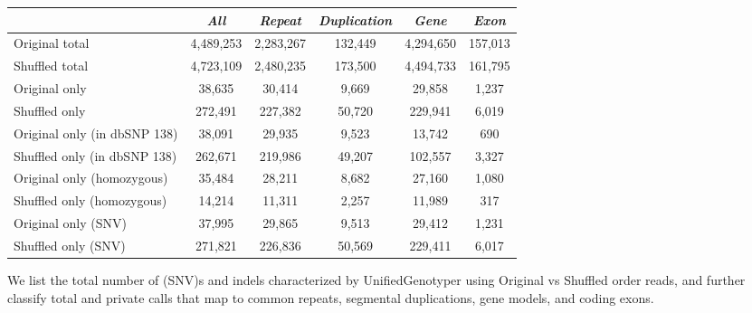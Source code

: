 \begin{table}[htb]
\begin{center}
\begin{tabular}{|l|c||c|c|c|c|}
\hline
\cline{2-6}
{\bf} & {\it All} & {\it Repeat} & {\it Duplication} & {\it Gene} & {\it Exon} \\
\hline
Original total & 4,489,253 & 2,283,267 & 132,449 & 4,294,650 & 157,013 \\
\hline
Shuffled total & 4,723,109 & 2,480,235 & 173,500 & 4,494,733 & 161,795 \\
\hline
Original only & 38,635 & 30,414 & 9,669 & 29,858 & 1,237 \\
\hline
Shuffled only & 272,491 & 227,382 & 50,720 & 229,941 & 6,019 \\
\hline
Original only (in dbSNP 138) & 38,091 & 29,935 & 9,523 & 13,742 & 690 \\
\hline
Shuffled only (in dbSNP 138) & 262,671 & 219,986 & 49,207 & 102,557 & 3,327 \\
\hline
Original only (homozygous) & 35,484 & 28,211 & 8,682 & 27,160 & 1,080 \\
\hline
Shuffled only (homozygous) & 14,214 & 11,311 & 2,257 & 11,989 & 317 \\
\hline
Original only (SNV) & 37,995 & 29,865 & 9,513 & 29,412 & 1,231 \\
\hline
Shuffled only (SNV) & 271,821 & 226,836 & 50,569 & 229,411 & 6,017 \\ 
\hline
\end{tabular}
\end{center}
{\footnotesize We list the total number of (SNV)s and indels characterized by UnifiedGenotyper using Original vs Shuffled order reads, 
and further classify total and private calls that map to common repeats, segmental duplications, gene models, and coding exons.}
\label{supptab:orig-vs-shuf-ug}
\end{table}

